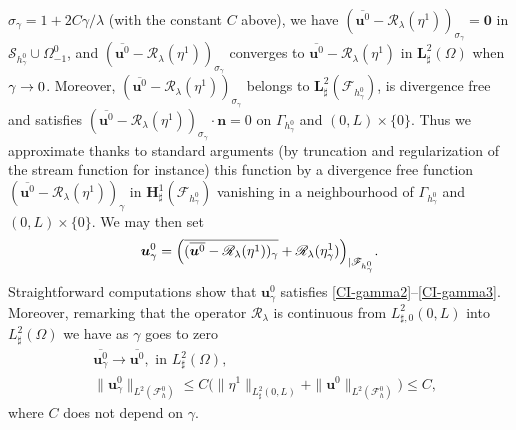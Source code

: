 \documentclass[11pt]{article}
\let\mathcal\mathscr
\theoremstyle{remark}
\theoremstyle{definition}
\newcommand{\ug}{\boldsymbol{u}}
\newcommand{\BS}[1]{\boldsymbol{#1}}
\let\CM\Omega
\begin{document}
$\sigma_{\gamma}\!=\!1+ 2C\gamma/\lambda$ (with the constant $C$ above), we have \hbox{$(\overline{\ug^{0}}\!-\!\mathcal{R}_\lambda(\eta^1))_{\sigma_\gamma}\!=\BS{0}$} in $\mathcal{S}_{h_\gamma^0}\cup \Omega_{-1}^0$, and $(\overline{\ug^{0}}-\mathcal{R}_\lambda(\eta^1))_{\sigma_\gamma}$ converges to $\overline{\ug^{0}}-\mathcal{R}_\lambda(\eta^1)$ in $\BS{L}_\sharp^2(\CM)$ when $\gamma \to\nobreak 0$. Moreover, $(\overline{\ug^{0}}-\mathcal{R}_\lambda(\eta^1))_{\sigma_\gamma}$ belongs to $\BS{L}^2_{\sharp}(\mathcal{F}_{h_\gamma^0})$, is divergence free and satisfies $(\overline{\ug^{0}}-\mathcal{R}_\lambda(\eta^1))_{\sigma_\gamma}\cdot\BS{n} =0$ on $\Gamma_{h^0_\gamma}$ and $(0, L)\times\{0\}$. Thus we approximate thanks to standard arguments (by truncation and regularization of the stream function for instance) this function by a divergence free function $(\overline{\ug^{0}}-\mathcal{R}_\lambda(\eta^1))_{\gamma}$ in $\BS{H}^1_{\sharp}(\mathcal{F}_{h_\gamma^0})$ vanishing in a neighbourhood of $\Gamma_{h^0_\gamma}$ and $(0, L)\times\{0\}$. We may then set
\[
\ug_{\gamma}^0 = \Bigl( \overline{(\overline{\ug^{0}}-\mathcal{R}_\lambda(\eta^1))_{\gamma} }+\mathcal{R}_\lambda(\eta_\gamma^1)\Bigr)_{|{\mathcal{F}_{h_\gamma^0}}}.
\]
Straightforward computations show that $\ug_{\gamma}^0$ satisfies \eqref{CI-gamma2}--\eqref{CI-gamma3}. Moreover,
remarking that the operator $\mathcal R_{\lambda}$ is continuous from $L^2_{\sharp,0}(0,L)$ into $L_\sharp^2(\Omega)$ we have as $\gamma$ goes to zero
\begin{align*}
& \overline{\ug^0_\gamma}\to \overline{\ug^0}, \text{ in }L^2_\sharp(\Omega),\\
& \| \ug^0_\gamma \|_{{L}^2(\mathcal F^0_{h})}\leq C\bigl( \|\eta^1\|_{L^2_\sharp(0, L)} + \|\ug^0\|_{L^2(\mathcal F_h^0)} \bigr)\leq C,
\end{align*}
where $C$ does not depend on $\gamma$.
\end{document}

